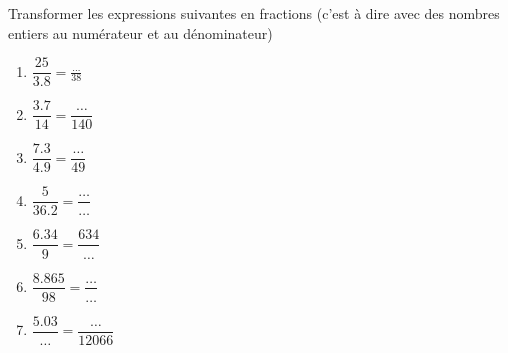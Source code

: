 
\begin{exercice}\label{exosmath-0867}

    Transformer les expressions suivantes en fractions (c'est à dire avec des nombres entiers au numérateur et au dénominateur)
    \begin{multicols}{2}
    \begin{enumerate}
        \item
            \( \dfrac{ 25 }{ 3.8 }=\frac{ \ldots }{ 38 }\)
        \item
            \( \dfrac{  3.7  }{  14  }=\dfrac{  \ldots  }{ 140 }\)
        \item
            \( \dfrac{  7.3  }{  4.9  }=\dfrac{  \ldots  }{ 49 }\)
        \item
            \( \dfrac{  5  }{  36.2  }=\dfrac{ \ldots   }{ \ldots }\)
        \item
            \( \dfrac{  6.34  }{  9  }=\dfrac{  634  }{ \ldots }\)
        \item
            \( \dfrac{  8.865  }{  98  }=\dfrac{  \ldots  }{ \ldots }\)
        \item
            \( \dfrac{  5.03  }{  \ldots  }=\dfrac{  \ldots  }{ 12066 }\)
    \end{enumerate}
    \end{multicols}

\end{exercice}

